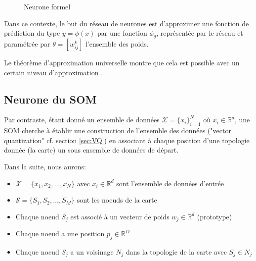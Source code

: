\documentclass[12pt,a4paper]{report}
\begin{document}
\begin{figure}[H]
\centering
{}
\caption{Neurone formel}
\label{fig:neurone}
\end{figure}

Dans ce contexte, le but du réseau de neurones est d'approximer une fonction de prédiction du type $y = \phi(x)$ par une fonction $\phi_\theta$, représentée
par le réseau et paramétrée par $\theta = [w_{ij}^k]$ l'ensemble des poids.

Le théorème d'approximation universelle montre que cela est possible avec un certain niveau d'approximation \cite{Approx_cap_multilayers}.

\subsection{Neurone du SOM}
Par contraste, étant donné un ensemble de données $\mathcal{X} = \{x_i\}_{i=1}^N$ où $x_i \in \mathbb{R}^d$, une SOM cherche à établir une construction de l'ensemble des données
("vector quantization" cf. section \ref{sec:VQ}) en associant à chaque position d'une topologie donnée (la carte) un sous ensemble de données de départ.

Dans la suite, nous aurons:
\begin{itemize}
    \item $\mathcal{X} = \{x_1, x_2, \ldots, x_N\}$ avec $x_i \in \mathbb{R}^d$ sont l'ensemble de données d'entrée 
    \item $\mathcal{S} = \{S_1, S_2, \ldots, S_M\}$ sont les noeuds de la carte
    \item Chaque noeud $S_j$ est associé à un vecteur de poids $w_j \in \mathbb{R}^d$ (prototype)
    \item Chaque noeud a une position $p_j \in \mathbb{R}^D$
    \item Chaque noeud $S_j$ a un voisinage $N_j$ dans la topologie de la carte avec $S_j \in N_j$
\end{itemize}
\end{document}
